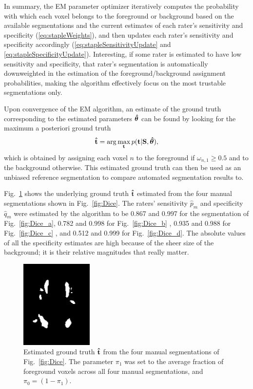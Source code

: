 \documentclass[10pt,twoside]{book}
\begin{document}
In summary, the EM parameter optimizer iteratively computes the probability with which each voxel belongs to the foreground or background based on the available segmentations and the current estimates of each rater's sensitivity and specificity (\eqref{eq:stapleWeights}), and then updates each rater's sensitivity and specificity accordingly (\eqref{eq:stapleSensitivityUpdate} and \eqref{eq:stapleSpecificityUpdate}). Interesting, if some rater is estimated to have low sensitivity and specificity, that rater's segmentation is automatically downweighted in the estimation of the foreground/background assignment probabilities, making the algorithm effectively focus on the most trustable segmentations only.

Upon convergence of the EM algorithm, an estimate of the ground truth corresponding to the estimated parameters ${\mbox{\boldmath {${\hat{\theta}}$}}}$ can be found by looking for the maximum a posteriori ground truth 
\begin{displaymath}
  \mathbf{\hat{t}} = \arg \max_{\mathbf{t}} p( \mathbf{t} | \mathbf{S}, {\mbox{\boldmath {${\hat{\theta}}$}}} ),
\end{displaymath}
which is obtained by assigning each voxel $n$ to the foreground if $\omega_{n,1} \geq 0.5$ and to the background otherwise. This estimated ground truth can then be used as an unbiased reference segmentation to compare automated segmentation results to.

Fig.~\ref{fig:staple} shows the underlying ground truth $\mathbf{\hat{t}}$ estimated from the four manual segmentations shown in Fig.~\ref{fig:Dice}. The raters' sensitivity $\hat{p}_m$ and specificity $\hat{q}_m$ were estimated by the algorithm to be 
0.867 and 0.997 
for the segmentation of Fig.~\ref{fig:Dice_a}, 
0.782 and 0.998
for Fig.~\ref{fig:Dice_b}
, 
0.935 and 0.988
for Fig.~\ref{fig:Dice_c}
, and 
0.512 and 0.999
for Fig.~\ref{fig:Dice_d}.
The absolute values of all the specificity estimates are high because of the sheer size of the background; it is their relative magnitudes that really matter.




\begin{figure}
  \centering
  \includegraphics[width=0.32\textwidth]{stapleEstimatedGroundTruth}
  \caption{Estimated ground truth $\mathbf{\hat{t}}$ from the four manual segmentations of Fig.~\ref{fig:Dice}. The parameter $\pi_1$ was set to the average fraction of foreground voxels across all four manual segmentations, and $\pi_0 = (1-\pi_1)$.}
  \label{fig:staple}
\end{figure}

\fi


\backmatter

\renewcommand{\sectionmark}[1]{\markright{#1}}
\sectionmark{Bibliography}




\end{document}
